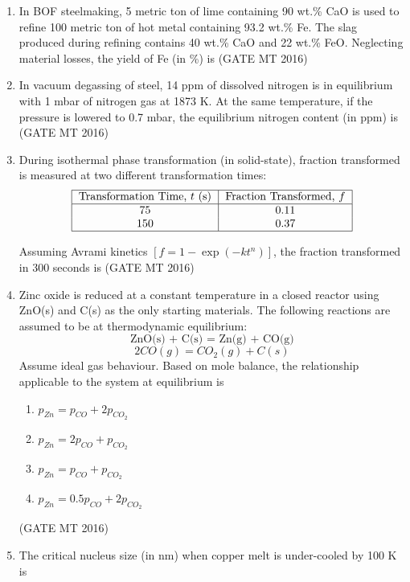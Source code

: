 \documentclass[journal, 11pt, onecolumn]{IEEEtran}
\theoremstyle{remark}
\begin{document}
\begin{enumerate}
\item In BOF steelmaking, 5 metric ton of lime containing 90 wt.\% CaO is used to refine 100 metric ton of hot metal containing 93.2 wt.\% Fe. The slag produced during refining contains 40 wt.\% CaO and 22 wt.\% FeO. Neglecting material losses, the yield of Fe (in \%) is
\hfill(GATE MT 2016)

\item In vacuum degassing of steel, 14 ppm of dissolved nitrogen is in equilibrium with 1 mbar of nitrogen gas at 1873 K. At the same temperature, if the pressure is lowered to 0.7 mbar, the equilibrium nitrogen content (in ppm) is 
\hfill(GATE MT 2016)

\item During isothermal phase transformation (in solid-state), fraction transformed is measured at two different transformation times:
\begin{align}
    \begin{tabular}{|c|c|}
\hline
Transformation Time, $t$ (s) & Fraction Transformed, $f$ \\
\hline
75 & 0.11 \\
150 & 0.37 \\
\hline
\end{tabular}
\end{align}

Assuming Avrami kinetics $[f = 1 - \exp(-kt^n)]$, the fraction transformed in 300 seconds is 
\hfill(GATE MT 2016)

\item Zinc oxide is reduced at a constant temperature in a closed reactor using ZnO(s) and C(s) as the only starting materials. The following reactions are assumed to be at thermodynamic equilibrium:
\[
\text{ZnO(s) + C(s) = Zn(g) + CO(g)}
\]
\[
2CO(g) = CO_2(g) + C(s)
\]
Assume ideal gas behaviour. Based on mole balance, the relationship applicable to the system at equilibrium is
\begin{enumerate}
\item $p_{Zn} = p_{CO} + 2p_{CO_2}$
\item $p_{Zn} = 2p_{CO} + p_{CO_2}$
\item $p_{Zn} = p_{CO} + p_{CO_2}$
\item $p_{Zn} = 0.5p_{CO} + 2p_{CO_2}$
\end{enumerate}
\hfill(GATE MT 2016)

\item The critical nucleus size (in nm) when copper melt is under-cooled by 100 K is


\end{enumerate}
\end{document}
